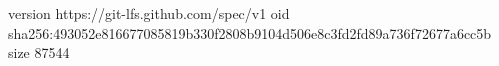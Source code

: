 version https://git-lfs.github.com/spec/v1
oid sha256:493052e816677085819b330f2808b9104d506e8c3fd2fd89a736f72677a6cc5b
size 87544
